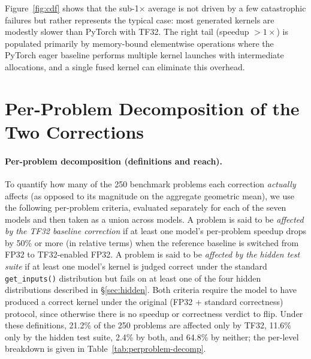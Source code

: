 \documentclass[]{fairmeta}
\begin{document}
Figure~\ref{fig:cdf} shows that the sub-1$\times$ average is not driven by a few catastrophic failures but rather represents the typical case: most generated kernels are modestly slower than PyTorch with TF32. The right tail (speedup $>1\times$) is populated primarily by memory-bound elementwise operations where the PyTorch eager baseline performs multiple kernel launches with intermediate allocations, and a single fused kernel can eliminate this overhead.

\section{Per-Problem Decomposition of the Two Corrections}
\label{app:perproblem-decomp}

\paragraph{Per-problem decomposition (definitions and reach).} To quantify how many of the 250 benchmark problems each correction \emph{actually} affects (as opposed to its magnitude on the aggregate geometric mean), we use the following per-problem criteria, evaluated separately for each of the seven models and then taken as a union across models. A problem is said to be \emph{affected by the TF32 baseline correction} if at least one model's per-problem speedup drops by 50\% or more (in relative terms) when the reference baseline is switched from FP32 to TF32-enabled FP32. A problem is said to be \emph{affected by the hidden test suite} if at least one model's kernel is judged correct under the standard \texttt{get\_inputs()} distribution but fails on at least one of the four hidden distributions described in \S\ref{sec:hidden}. Both criteria require the model to have produced a correct kernel under the original (FP32 + standard correctness) protocol, since otherwise there is no speedup or correctness verdict to flip. Under these definitions, 21.2\% of the 250 problems are affected only by TF32, 11.6\% only by the hidden test suite, 2.4\% by both, and 64.8\% by neither; the per-level breakdown is given in Table~\ref{tab:perproblem-decomp}.
\end{document}
